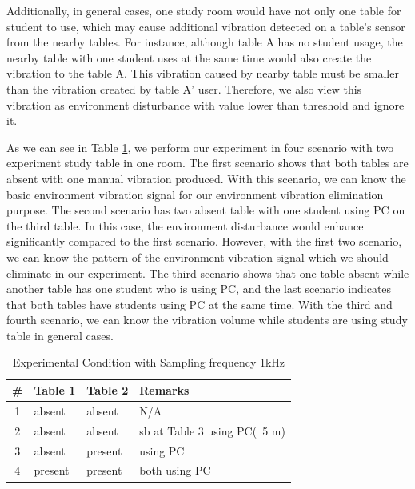 \documentclass{sig-alternate-ipsn13}
\newcommand\tabhead[1]{\small\textbf{#1}}
\begin{document}
Additionally, in general cases, one study room would have not only one table for student to use, which may cause additional vibration detected on a table's sensor from the nearby tables. For instance, although table A has no student usage, the nearby table with one student uses at the same time would also create the vibration to the table A. This vibration caused by nearby table must be smaller than the vibration created by table A' user. Therefore, we also view this vibration as environment disturbance with value lower than threshold and ignore it.

As we can see in Table \ref{tab:table1}, we perform our experiment in four scenario with two experiment study table in one room. The first scenario shows that both tables are absent with one manual vibration produced. With this scenario, we can know the basic environment vibration signal for our environment vibration elimination purpose. 
The second scenario has two absent table with one student using PC on the third table. In this case, the environment disturbance would enhance significantly compared to the first scenario. However, with the first two scenario, we can know the pattern of the environment vibration signal which we should eliminate in our experiment. The third scenario shows that one table absent while another table has one student who is using PC, and the last scenario indicates that both tables have students using PC at the same time. With the third and fourth scenario, we can know the vibration volume while students are using study table in general cases.

\begin{table}
    \centering
    \caption{Experimental Condition with Sampling frequency 1kHz}
    \begin{tabular}{|c|l|l|l|}
      \hline
      \tabhead{\#} &
      \multicolumn{1}{|p{0.1\columnwidth}|}{\centering\tabhead{Table 1}} &
      \multicolumn{1}{|p{0.1\columnwidth}|}{\centering\tabhead{Table 2}} &
      \multicolumn{1}{|p{0.45\columnwidth}|}{\centering\tabhead{Remarks}} \\
      \hline
      1 & absent & absent & N/A \\
      \hline
      2 & absent & absent & sb at Table 3 using PC(~5 m)\\
      \hline
      3 & absent & present & using PC\\
      \hline
      4 & present & present & both using PC\\
      \hline
    \end{tabular}
    
    \label{tab:table1}
  \end{table}
\end{document}
